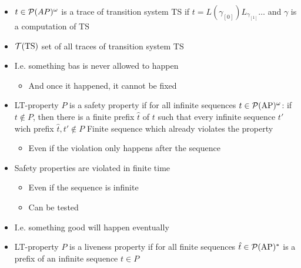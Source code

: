 \begin{itemize}
\begin{itemize}
\begin{itemize}
\begin{itemize}
                        \end{itemize}
                    \item $t \in \mathcal{P}(AP)^\omega$ is a trace of transition system TS if $t = L(\gamma_{[0]})L_{\gamma_{[1]}} \dots$ and $\gamma$ is a computation of TS
                    \item $\mathcal{T}(\text{TS})$ set of all traces of transition system TS
                \end{itemize}
                \begin{itemize}
                    \item I.e. something bas is never allowed to happen
                        \begin{itemize}
                            \item And once it happened, it cannot be fixed
                        \end{itemize}
                    \item LT-property $P$ is a safety property if for all infinite sequences $t \in \mathcal{P}(\text{AP})^\omega$: if $t \notin P$, then there is a finite prefix $\hat{t}$ of $t$ such that every infinite sequence $t'$ wich prefix $\hat{t}, t' \notin P$
                     Finite sequence which already violates the property
                        \begin{itemize}
                            \item Even if the violation only happens after the sequence
                        \end{itemize}
                    \item Safety properties are violated in finite time
                        \begin{itemize}
                            \item Even if the sequence is infinite
                            \item Can be tested
                        \end{itemize}
                \end{itemize}
                \begin{itemize}
                    \item I.e. something good will happen eventually
                    \item LT-property $P$ is a liveness property if for all finite sequences $\hat{t} \in \mathcal{P}(\text{AP})^*$ is a prefix of an infinite sequence $t \in P$

\end{itemize}
\end{itemize}
\end{itemize}
